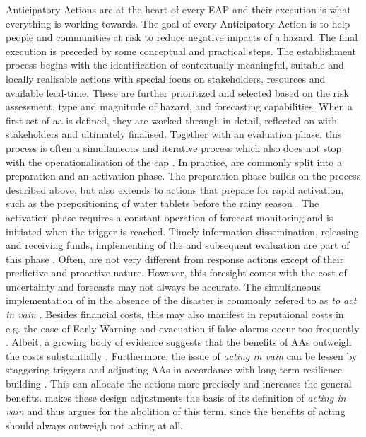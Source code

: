 {Anticipatory Actions are at the heart of every EAP and their execution is what everything is working towards. The goal of every Anticipatory Action is to help people and communities at risk to reduce negative impacts of a hazard. The final execution is preceded by some conceptual and practical steps. The establishment process begins with the identification of contextually meaningful, suitable and locally realisable actions with special focus on stakeholders, resources and available lead-time. These are further prioritized and selected based on the risk assessment, type and magnitude of hazard, and forecasting capabilities. When a first set of \acrshort*{aa} is defined, they are worked through in detail, reflected on with stakeholders and ultimately finalised. Together with an evaluation phase, this process is often a simultaneous and iterative process which also does not stop with the operationalisation of the \acrshort{eap} \autocite{elisabethstephensFORECASTBASEDACTION2015,ifrcGlossaryTermsForecastbased2023,ifrcFbFPractitionersManual2023a,rcrcFORECASTBASEDFINANCINGEARLY2020}.
In practice,  are commonly split into a preparation and an activation phase. The preparation phase builds on the process described above, but also extends to actions that prepare for rapid activation, such as the prepositioning of water tablets before the rainy season \autocite{elisabethstephensFORECASTBASEDACTION2015}. The activation phase requires a constant operation of forecast monitoring and is initiated when the trigger is reached. Timely information dissemination, releasing and receiving funds, implementing of the  and subsequent evaluation are part of this phase \autocite{elisabethstephensFORECASTBASEDACTION2015,ifrcFbFPractitionersManual2023a}. Often,  are not very different from response actions except of their predictive and proactive nature. However, this foresight comes with the cost of uncertainty and forecasts may not always be accurate. The simultaneous implementation of  in the absence of the disaster is commonly refered to as \textit{to act in vain} \autocite{coughlandeperezForecastbasedFinancingApproach2015}. Besides financial costs, this may also manifest in reputaional costs in e.g. the case of Early Warning and evacuation if false alarms occur too frequently \autocite{elisabethstephensFORECASTBASEDACTION2015}. Albeit, a growing body of evidence suggests that the benefits of AAs outweigh the costs substantially \autocite{cabotventonEconomicsResilienceDrought2018,coughlandeperezForecastbasedFinancingApproach2015,gualazziniEWEAEarlyWarning2021}. Furthermore, the issue of \textit{acting in vain} can be lessen by staggering triggers and adjusting AAs in accordance with long-term resilience building \autocite{wfpMonitoringEvaluationAnticipatory2021}. This can allocate the actions more precisely and increases the general benefits. \autocite{ifrcGlossaryTermsForecastbased2023} makes these design adjustments the basis of its definition of \textit{acting in vain} and thus argues for the abolition of this term, since the benefits of acting should always outweigh not acting at all.


}
